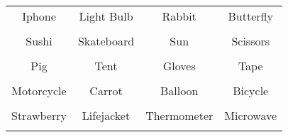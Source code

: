 \documentclass[12pt,a4paper]{article}
\begin{document}
\thispagestyle{empty}
\begin{table}[]
\centering
\Huge
\begin{tabular}{cccc}
 Iphone& Light Bulb& Rabbit& Butterfly\\  & & & \\
 Sushi& Skateboard& Sun& Scissors\\  & & & \\
 Pig& Tent& Gloves& Tape\\  & & & \\
 Motorcycle& Carrot& Balloon& Bicycle\\  & & & \\
 Strawberry& Lifejacket& Thermometer& Microwave\\  & & & \\
\end{tabular}
\end{table}
\end{document}
